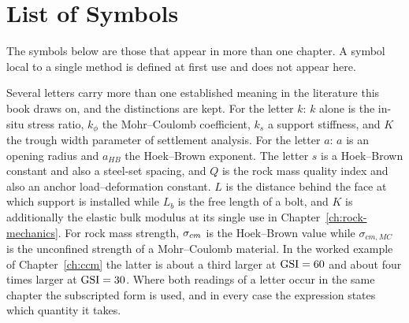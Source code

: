 \chapter*{List of Symbols}
{}
\label{ch:symbols}

The symbols below are those that appear in more than one chapter. A symbol
local to a single method is defined at first use and does not appear here.

Several letters carry more than one established meaning in the literature this
book draws on, and the distinctions are kept. For the
letter $k$: $k$ alone is the in-situ stress ratio, $k_\phi$ the Mohr--Coulomb
coefficient, $k_s$ a support stiffness, and $K$ the trough width parameter of
settlement analysis. For the letter $a$: $a$ is an opening radius and $a_{HB}$
the Hoek--Brown exponent. The letter $s$ is a Hoek--Brown constant and also a
steel-set spacing, and $Q$ is the rock mass quality index and also an anchor
load--deformation constant. $L$ is the distance behind the face at which support
is installed while $L_b$ is the free length of a bolt, and $K$ is additionally the elastic bulk modulus at
its single use in Chapter~\ref{ch:rock-mechanics}. For rock mass strength, $\sigma_{cm}$ is the
Hoek--Brown value while $\sigma_{cm,MC}$ is the unconfined strength of a
Mohr--Coulomb material. In the worked example of
Chapter~\ref{ch:ccm} the latter is about a third larger at $\mathrm{GSI} = 60$ and
about four times larger at $\mathrm{GSI} = 30$. Where both readings of a letter occur
in the same chapter the subscripted form is used, and in every case the
expression states which quantity it takes.

